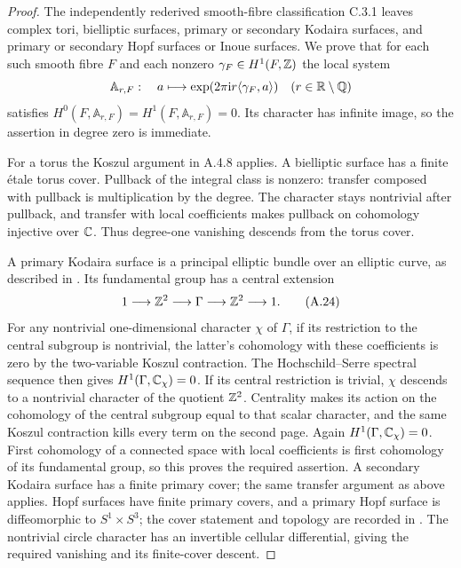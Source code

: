 \begin{proof}
The independently rederived smooth-fibre classification C.3.1 leaves complex tori, bielliptic surfaces, primary or secondary Kodaira surfaces, and primary or secondary Hopf surfaces or Inoue surfaces. We prove that for each such smooth fibre $F$ and each nonzero $\gamma_F\in H^1(F,\mathbb Z)$ the local system
\[
 \mathbb A_{r,F}:\quad a\longmapsto
       \exp(2\pi\mathrm i r\langle\gamma_F,a\rangle)
 \quad(r\in\mathbb R\setminus\mathbb Q)
\]
satisfies $H^0(F,\mathbb A_{r,F})=H^1(F,\mathbb A_{r,F})=0$. Its character has infinite image, so the assertion in degree zero is immediate.

For a torus the Koszul argument in A.4.8 applies. A bielliptic surface has a finite étale torus cover. Pullback of the integral class is nonzero: transfer composed with pullback is multiplication by the degree. The character stays nontrivial after pullback, and transfer with local coefficients makes pullback on cohomology injective over $\mathbb C$. Thus degree-one vanishing descends from the torus cover.

A primary Kodaira surface is a principal elliptic bundle over an elliptic curve, as described in \cite[\S1 and the central-extension diagram in the proof of Lemma~1.1]{SS2002}. Its fundamental group has a central extension
\[
 1\longrightarrow\mathbb Z^2\longrightarrow\Gamma\longrightarrow\mathbb Z^2
       \longrightarrow1.
 \tag{A.24}
\]
For any nontrivial one-dimensional character $\chi$ of $\Gamma$, if its restriction to the central subgroup is nontrivial, the latter's cohomology with these coefficients is zero by the two-variable Koszul contraction. The Hochschild--Serre spectral sequence then gives $H^1(\Gamma,\mathbb C_\chi)=0$. If its central restriction is trivial, $\chi$ descends to a nontrivial character of the quotient $\mathbb Z^2$. Centrality makes its action on the cohomology of the central subgroup equal to that scalar character, and the same Koszul contraction kills every term on the second page. Again $H^1(\Gamma,\mathbb C_\chi)=0$. First cohomology of a connected space with local coefficients is first cohomology of its fundamental group, so this proves the required assertion. A secondary Kodaira surface has a finite primary cover; the same transfer argument as above applies. Hopf surfaces have finite primary covers, and a primary Hopf surface is diffeomorphic to $S^1\times S^3$; the cover statement and topology are recorded in \cite[\S2.1.1 and Theorem~2.2]{Albanese2020}. The nontrivial circle character has an invertible cellular differential, giving the required vanishing and its finite-cover descent.


\end{proof}
